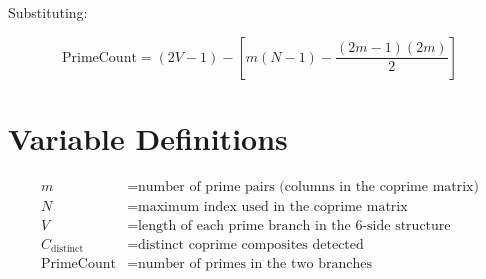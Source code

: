 \documentclass[12pt]{article}
\begin{document}
Substituting:



\[
\text{PrimeCount}
=
(2V - 1)
-
\left[
m(N-1)
-
\frac{(2m-1)(2m)}{2}
\right]
\]



\section{Variable Definitions}



\[
\begin{aligned}
m &= \text{number of prime pairs (columns in the coprime matrix)} \\
N &= \text{maximum index used in the coprime matrix} \\
V &= \text{length of each prime branch in the 6-side structure} \\
C_{\text{distinct}} &= \text{distinct coprime composites detected} \\
\text{PrimeCount} &= \text{number of primes in the two branches}
\end{aligned}
\]
\end{document}
